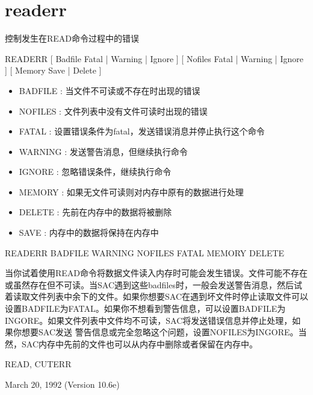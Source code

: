 \section{readerr}
\label{cmd:readerr}

控制发生在READ命令过程中的错误

READERR [ Badfile Fatal | Warning | Ignore ] [ Nofiles Fatal | Warning | Ignore ] [ Memory Save | Delete ]

\begin{itemize}
\item BADFILE : 当文件不可读或不存在时出现的错误 
\item NOFILES : 文件列表中没有文件可读时出现的错误 
\item FATAL : 设置错误条件为fatal，发送错误消息并停止执行这个命令 
\item WARNING : 发送警告消息，但继续执行命令 
\item IGNORE : 忽略错误条件，继续执行命令 
\item MEMORY : 如果无文件可读则对内存中原有的数据进行处理 
\item DELETE : 先前在内存中的数据将被删除 
\item SAVE : 内存中的数据将保持在内存中 
\end{itemize}

READERR BADFILE WARNING NOFILES FATAL MEMORY DELETE

当你试着使用READ命令将数据文件读入内存时可能会发生错误。文件可能不存在或虽然存在但不可读。当SAC遇到这些badfiles时，一般会发送警告消息，然后试着读取文件列表中余下的文件。如果你想要SAC在遇到坏文件时停止读取文件可以设置BADFILE为FATAL。如果你不想看到警告信息，可以设置BADFILE为INGORE。如果文件列表中文件均不可读，SAC将发送错误信息并停止处理，如果你想要SAC发送	警告信息或完全忽略这个问题，设置NOFILES为INGORE。当然，SAC内存中先前的文件也可以从内存中删除或者保留在内存中。

READ, CUTERR

March 20, 1992 (Version 10.6e)
